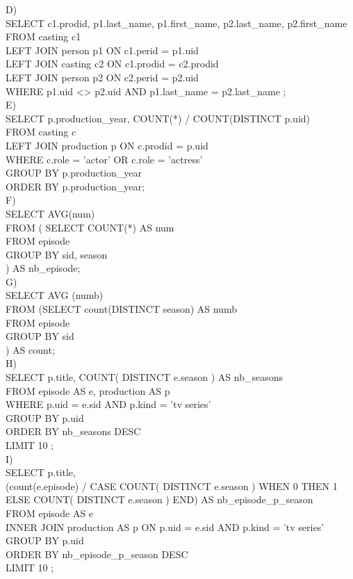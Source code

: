 \documentclass{article}
\begin{document}
D)\\
SELECT c1.prodid, p1.last_name, p1.first_name, p2.last_name, p2.first_name\\
FROM casting c1\\
LEFT JOIN person p1 ON c1.perid = p1.uid\\
LEFT JOIN casting c2 ON c1.prodid = c2.prodid\\
LEFT JOIN person p2 ON c2.perid = p2.uid\\
WHERE p1.uid <> p2.uid AND p1.last_name = p2.last_name ;\\

E)\\
SELECT p.production_year, COUNT(*) / COUNT(DISTINCT p.uid)\\
FROM casting c\\
LEFT JOIN production p ON c.prodid = p.uid\\
WHERE c.role = 'actor' OR c.role = 'actress'\\ 
GROUP BY p.production_year\\
ORDER BY p.production_year;\\

F)\\
SELECT AVG(num) \\
FROM (	SELECT COUNT(*) AS num\\
	FROM episode\\
	GROUP BY sid, season\\
	) AS nb_episode;\\

G)\\
SELECT AVG (numb) \\
FROM 	(SELECT count(DISTINCT season) AS numb\\
	FROM episode\\
	GROUP BY sid\\
	) AS count;\\

H)\\
SELECT p.title, COUNT( DISTINCT e.season ) AS nb_seasons\\
FROM episode AS e, production AS p\\
WHERE p.uid = e.sid AND p.kind = 'tv series'\\
GROUP BY p.uid\\
ORDER BY nb_seasons DESC\\
LIMIT 10 ;\\

I)\\
SELECT p.title,\\ 
(count(e.episode) / CASE COUNT( DISTINCT e.season ) WHEN 0 THEN 1 ELSE COUNT( DISTINCT e.season ) END) AS nb_episode_p_season\\
FROM episode AS e\\
INNER JOIN production AS p ON p.uid = e.sid AND p.kind = 'tv series'\\
GROUP BY p.uid\\
ORDER BY nb_episode_p_season DESC\\
LIMIT 10 ;\\
\end{document}
